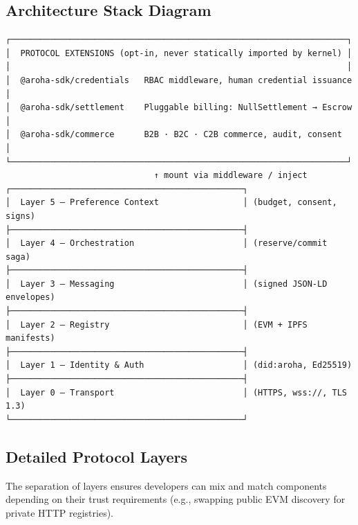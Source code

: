 \documentclass[11pt,a4paper]{article}
\begin{document}
\subsection{Architecture Stack Diagram}
\begin{verbatim}
┌────────────────────────────────────────────────────────────────────┐
│  PROTOCOL EXTENSIONS (opt-in, never statically imported by kernel) │
│                                                                    │
│  @aroha-sdk/credentials   RBAC middleware, human credential issuance    │
│  @aroha-sdk/settlement    Pluggable billing: NullSettlement → Escrow    │
│  @aroha-sdk/commerce      B2B · B2C · C2B commerce, audit, consent      │
└────────────────────────────────────────────────────────────────────┘
                              ↑ mount via middleware / inject
┌───────────────────────────────────────────────┐
│  Layer 5 — Preference Context                 │ (budget, consent, signs)
├───────────────────────────────────────────────┤
│  Layer 4 — Orchestration                      │ (reserve/commit saga)
├───────────────────────────────────────────────┤
│  Layer 3 — Messaging                          │ (signed JSON-LD envelopes)
├───────────────────────────────────────────────┤
│  Layer 2 — Registry                           │ (EVM + IPFS manifests)
├───────────────────────────────────────────────┤
│  Layer 1 — Identity & Auth                    │ (did:aroha, Ed25519)
├───────────────────────────────────────────────┤
│  Layer 0 — Transport                          │ (HTTPS, wss://, TLS 1.3)
└───────────────────────────────────────────────┘
\end{verbatim}

\subsection{Detailed Protocol Layers}

The separation of layers ensures developers can mix and match components depending on their trust requirements (e.g., swapping public EVM discovery for private HTTP registries).
\end{document}

